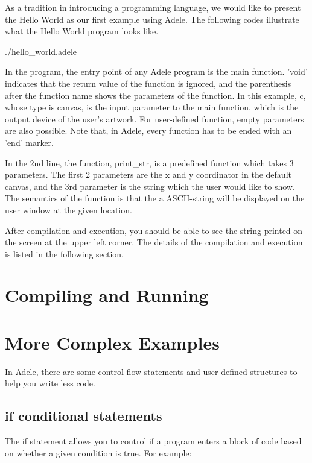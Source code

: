 \documentclass[11pt,letterpaper]{article}
\begin{document}
As a tradition in introducing a programming language, we would like to present the Hello World as our first example using Adele. The following codes illustrate what the Hello World program looks like.

 {./hello_world.adele}

In the program, the entry point of any Adele program is the main function. 'void' indicates that the return value of the function is ignored, and the parenthesis after the function name shows the parameters of the function. In this example, c, whose type is canvas, is the input parameter to the main function, which is the output device of the user's artwork. For user-defined function, empty parameters are also possible. Note that, in Adele, every function has to be ended with an 'end' marker.

In the 2nd line, the function, print\_str, is a predefined function which takes 3 parameters. The first 2 parameters are the x and y coordinator in the default canvas, and the 3rd parameter is the string which the user would like to show. The semantics of the function is that the a ASCII-string will be displayed on the user window at the given location.

After compilation and execution, you should be able to see the string printed on the screen at the upper left corner. The details of the compilation and execution is listed in the following section.

\section {Compiling and Running}

\section {More Complex Examples}

In Adele, there are some control flow statements and user defined structures to help you write less code.

\subsection {if conditional statements}

The if statement allows you to control if a program enters a block of code based on whether a given condition is true. For example:
\end{document}

